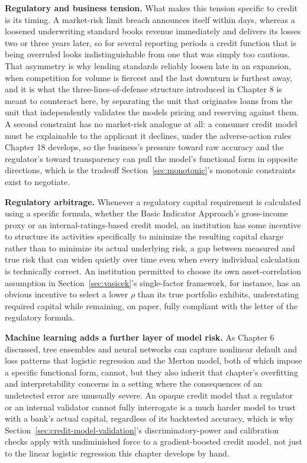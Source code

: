 \documentclass[../ai_in_finance]{subfiles}
\begin{document}
\textbf{Regulatory and business tension.} What makes this tension specific to credit is its timing. A market-risk limit breach announces itself within days, whereas a loosened underwriting standard books revenue immediately and delivers its losses two or three years later, so for several reporting periods a credit function that is being overruled looks indistinguishable from one that was simply too cautious. That asymmetry is why lending standards reliably loosen late in an expansion, when competition for volume is fiercest and the last downturn is furthest away, and it is what the three-lines-of-defense structure introduced in Chapter 8 is meant to counteract here, by separating the unit that originates loans from the unit that independently validates the models pricing and reserving against them.
A second constraint has no market-risk analogue at all: a consumer credit model must be explainable to the applicant it declines, under the adverse-action rules Chapter 18 develops, so the business's pressure toward raw accuracy and the regulator's toward transparency can pull the model's functional form in opposite directions, which is the tradeoff Section~\ref{sec:monotonic}'s monotonic constraints exist to negotiate.

\textbf{Regulatory arbitrage.} Whenever a regulatory capital requirement is calculated using a specific formula, whether the Basic Indicator Approach's gross-income proxy or an internal-ratings-based credit model, an institution has some incentive to structure its activities specifically to minimize the resulting capital charge rather than to minimize its actual underlying risk, a gap between measured and true risk that can widen quietly over time even when every individual calculation is technically correct.
An institution permitted to choose its own asset-correlation assumption in Section~\ref{sec:vasicek}'s single-factor framework, for instance, has an obvious incentive to select a lower $\rho$ than its true portfolio exhibits, understating required capital while remaining, on paper, fully compliant with the letter of the regulatory formula.

\textbf{Machine learning adds a further layer of model risk.} As Chapter 6 discussed, tree ensembles and neural networks can capture nonlinear default and loss patterns that logistic regression and the Merton model, both of which impose a specific functional form, cannot, but they also inherit that chapter's overfitting and interpretability concerns in a setting where the consequences of an undetected error are unusually severe.
An opaque credit model that a regulator or an internal validator cannot fully interrogate is a much harder model to trust with a bank's actual capital, regardless of its backtested accuracy, which is why Section~\ref{sec:credit-model-validation}'s discriminatory-power and calibration checks apply with undiminished force to a gradient-boosted credit model, not just to the linear logistic regression this chapter develops by hand.
\end{document}
